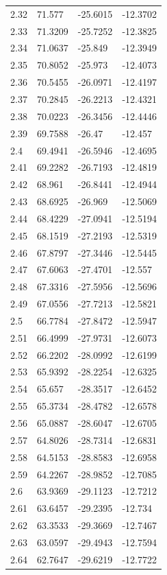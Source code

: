 \begin{tabular}{llll}
2.32 & 71.577 & -25.6015 & -12.3702 \\
2.33 & 71.3209 & -25.7252 & -12.3825 \\
2.34 & 71.0637 & -25.849 & -12.3949 \\
2.35 & 70.8052 & -25.973 & -12.4073 \\
2.36 & 70.5455 & -26.0971 & -12.4197 \\
2.37 & 70.2845 & -26.2213 & -12.4321 \\
2.38 & 70.0223 & -26.3456 & -12.4446 \\
2.39 & 69.7588 & -26.47 & -12.457 \\
2.4 & 69.4941 & -26.5946 & -12.4695 \\
2.41 & 69.2282 & -26.7193 & -12.4819 \\
2.42 & 68.961 & -26.8441 & -12.4944 \\
2.43 & 68.6925 & -26.969 & -12.5069 \\
2.44 & 68.4229 & -27.0941 & -12.5194 \\
2.45 & 68.1519 & -27.2193 & -12.5319 \\
2.46 & 67.8797 & -27.3446 & -12.5445 \\
2.47 & 67.6063 & -27.4701 & -12.557 \\
2.48 & 67.3316 & -27.5956 & -12.5696 \\
2.49 & 67.0556 & -27.7213 & -12.5821 \\
2.5 & 66.7784 & -27.8472 & -12.5947 \\
2.51 & 66.4999 & -27.9731 & -12.6073 \\
2.52 & 66.2202 & -28.0992 & -12.6199 \\
2.53 & 65.9392 & -28.2254 & -12.6325 \\
2.54 & 65.657 & -28.3517 & -12.6452 \\
2.55 & 65.3734 & -28.4782 & -12.6578 \\
2.56 & 65.0887 & -28.6047 & -12.6705 \\
2.57 & 64.8026 & -28.7314 & -12.6831 \\
2.58 & 64.5153 & -28.8583 & -12.6958 \\
2.59 & 64.2267 & -28.9852 & -12.7085 \\
2.6 & 63.9369 & -29.1123 & -12.7212 \\
2.61 & 63.6457 & -29.2395 & -12.734 \\
2.62 & 63.3533 & -29.3669 & -12.7467 \\
2.63 & 63.0597 & -29.4943 & -12.7594 \\
2.64 & 62.7647 & -29.6219 & -12.7722 \\

\end{tabular}

